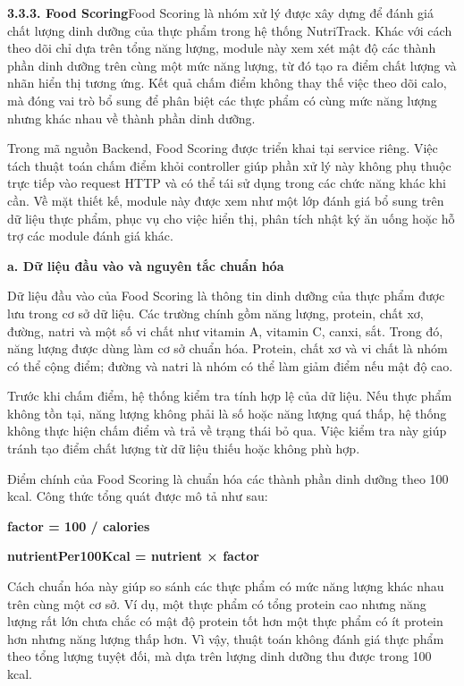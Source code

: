 \textbf{3.3.3. Food Scoring}Food Scoring là nhóm xử lý được xây dựng để đánh giá chất lượng dinh dưỡng của thực phẩm trong hệ thống NutriTrack. Khác với cách theo dõi chỉ dựa trên tổng năng lượng, module này xem xét mật độ các thành phần dinh dưỡng trên cùng một mức năng lượng, từ đó tạo ra điểm chất lượng và nhãn hiển thị tương ứng. Kết quả chấm điểm không thay thế việc theo dõi calo, mà đóng vai trò bổ sung để phân biệt các thực phẩm có cùng mức năng lượng nhưng khác nhau về thành phần dinh dưỡng.

Trong mã nguồn Backend, Food Scoring được triển khai tại service riêng. Việc tách thuật toán chấm điểm khỏi controller giúp phần xử lý này không phụ thuộc trực tiếp vào request HTTP và có thể tái sử dụng trong các chức năng khác khi cần. Về mặt thiết kế, module này được xem như một lớp đánh giá bổ sung trên dữ liệu thực phẩm, phục vụ cho việc hiển thị, phân tích nhật ký ăn uống hoặc hỗ trợ các module đánh giá khác.

\textbf{a. Dữ liệu đầu vào và nguyên tắc chuẩn hóa}

Dữ liệu đầu vào của Food Scoring là thông tin dinh dưỡng của thực phẩm được lưu trong cơ sở dữ liệu. Các trường chính gồm năng lượng, protein, chất xơ, đường, natri và một số vi chất như vitamin A, vitamin C, canxi, sắt. Trong đó, năng lượng được dùng làm cơ sở chuẩn hóa. Protein, chất xơ và vi chất là nhóm có thể cộng điểm; đường và natri là nhóm có thể làm giảm điểm nếu mật độ cao.

Trước khi chấm điểm, hệ thống kiểm tra tính hợp lệ của dữ liệu. Nếu thực phẩm không tồn tại, năng lượng không phải là số hoặc năng lượng quá thấp, hệ thống không thực hiện chấm điểm và trả về trạng thái bỏ qua. Việc kiểm tra này giúp tránh tạo điểm chất lượng từ dữ liệu thiếu hoặc không phù hợp.

Điểm chính của Food Scoring là chuẩn hóa các thành phần dinh dưỡng theo 100 kcal. Công thức tổng quát được mô tả như sau:

\textbf{factor = 100 / calories}

\textbf{nutrientPer100Kcal = nutrient × factor}

Cách chuẩn hóa này giúp so sánh các thực phẩm có mức năng lượng khác nhau trên cùng một cơ sở. Ví dụ, một thực phẩm có tổng protein cao nhưng năng lượng rất lớn chưa chắc có mật độ protein tốt hơn một thực phẩm có ít protein hơn nhưng năng lượng thấp hơn. Vì vậy, thuật toán không đánh giá thực phẩm theo tổng lượng tuyệt đối, mà dựa trên lượng dinh dưỡng thu được trong 100 kcal.

